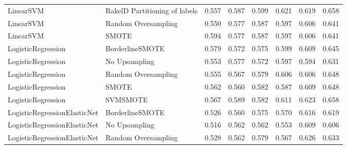 \begin{tabular}{llllllll}
                      LinearSVM & RakelD Partitioning of labels & 0.557 &                     0.587 &                 0.599 &                  0.621 &                                   0.619 &    0.658 \\
                      LinearSVM &           Random Oversampling & 0.550 &                     0.577 &                 0.587 &                  0.597 &                                   0.606 &    0.641 \\
                      LinearSVM &                         SMOTE & 0.594 &                     0.577 &                 0.587 &                  0.597 &                                   0.606 &    0.641 \\
             LogisticRegression &               BorderlineSMOTE & 0.579 &                     0.572 &                 0.575 &                  0.599 &                                   0.609 &    0.645 \\
             LogisticRegression &                 No Upsampling & 0.553 &                     0.577 &                 0.572 &                  0.597 &                                   0.594 &    0.631 \\
             LogisticRegression &           Random Oversampling & 0.555 &                     0.567 &                 0.579 &                  0.606 &                                   0.606 &    0.648 \\
             LogisticRegression &                         SMOTE & 0.562 &                     0.560 &                 0.582 &                  0.587 &                                   0.609 &    0.648 \\
             LogisticRegression &                      SVMSMOTE & 0.567 &                     0.589 &                 0.582 &                  0.611 &                                   0.623 &    0.658 \\
   LogisticRegressionElasticNet &               BorderlineSMOTE & 0.526 &                     0.560 &                 0.575 &                  0.570 &                                   0.616 &    0.619 \\
   LogisticRegressionElasticNet &                 No Upsampling & 0.516 &                     0.562 &                 0.562 &                  0.553 &                                   0.609 &    0.606 \\
   LogisticRegressionElasticNet &           Random Oversampling & 0.528 &                     0.562 &                 0.579 &                  0.567 &                                   0.626 &    0.633 \\

\end{tabular}
